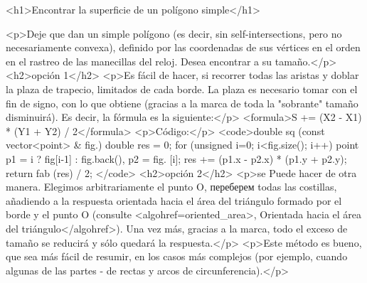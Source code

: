 <h1>Encontrar la superficie de un polígono simple</h1>

<p>Deje que dan un simple polígono (es decir, sin self-intersections, pero no necesariamente convexa), definido por las coordenadas de sus vértices en el orden en el rastreo de las manecillas del reloj. Desea encontrar a su tamaño.</p>
<h2>opción 1</h2>
<p>Es fácil de hacer, si recorrer todas las aristas y doblar la plaza de trapecio, limitados de cada borde. La plaza es necesario tomar con el fin de signo, con lo que obtiene (gracias a la marca de toda la "sobrante" tamaño disminuirá). Es decir, la fórmula es la siguiente:</p>
<formula>S += (X2 - X1) * (Y1 + Y2) / 2</formula>
<p>Código:</p>
<code>double sq (const vector<point> & fig.)
{
double res = 0;
for (unsigned i=0; i<fig.size(); i++)
{
point
p1 = i ? fig[i-1] : fig.back(),
p2 = fig. [i];
res += (p1.x - p2.x) * (p1.y + p2.y);
}
return fab (res) / 2;
}</code>
<h2>opción 2</h2>
<p>se Puede hacer de otra manera. Elegimos arbitrariamente el punto O, переберем todas las costillas, añadiendo a la respuesta orientada hacia el área del triángulo formado por el borde y el punto O (consulte <algohref=oriented_area>, Orientada hacia el área del triángulo</algohref>). Una vez más, gracias a la marca, todo el exceso de tamaño se reducirá y sólo quedará la respuesta.</p>
<p>Este método es bueno, que sea más fácil de resumir, en los casos más complejos (por ejemplo, cuando algunas de las partes - de rectas y arcos de circunferencia).</p>